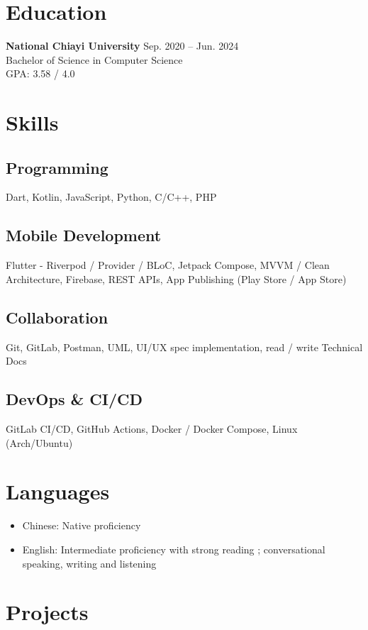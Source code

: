 \documentclass[a4paper,10pt]{article}
\begin{document}
\section*{Education}
\textbf{National Chiayi University} \hfill Sep. 2020 -- Jun. 2024 \\
Bachelor of Science in Computer Science \\

GPA: 3.58 / 4.0

\section*{Skills}

\subsection*{Programming}
Dart, Kotlin, JavaScript, Python, C/C++, PHP

\subsection*{Mobile Development}
Flutter - Riverpod / Provider / BLoC, Jetpack Compose, MVVM / Clean Architecture, Firebase, REST APIs, App Publishing (Play Store / App Store)

\subsection*{Collaboration}
Git, GitLab, Postman, UML, UI/UX spec implementation, read / write Technical Docs

\subsection*{DevOps \& CI/CD}
GitLab CI/CD, GitHub Actions, Docker / Docker Compose, Linux (Arch/Ubuntu)

\section*{Languages}
\begin{itemize}[left=0pt, label={--}]
    \item Chinese: Native proficiency
    \item English: Intermediate proficiency with strong reading ; conversational speaking, writing and listening
\end{itemize}

\newpage

\section*{Projects}
\end{document}
